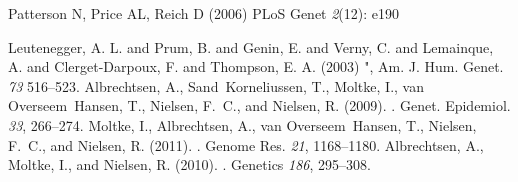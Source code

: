 \documentclass[a4paper, 11pt]{article}
\begin{document}
\begin{thebibliography}{10}
Patterson N, Price AL, Reich D
\newblock (2006)
\newblock PLoS Genet {\em 2}(12): e190

Leutenegger, A. L.  and Prum, B.  and Genin, E.  and Verny, C.  and Lemainque, A.  and Clerget-Darpoux, F.  and Thompson, E. A.
\newblock (2003)
",
 \newblock Am. J. Hum. Genet. {\em 73} 516--523.
Albrechtsen, A., Sand~Korneliussen, T., Moltke, I., van Overseem~Hansen, T.,
  Nielsen, F.~C., and Nielsen, R.
\newblock (2009).
.
\newblock Genet. Epidemiol. {\em 33}, 266--274.
 Moltke, I., Albrechtsen, A., van Overseem~Hansen, T.,
  Nielsen, F.~C., and Nielsen, R.
\newblock (2011).
.
\newblock Genome Res. {\em 21}, 1168--1180.
Albrechtsen, A., Moltke, I., and Nielsen, R.
\newblock (2010).
.
\newblock Genetics {\em 186}, 295--308.
\end{thebibliography}
\end{document}
